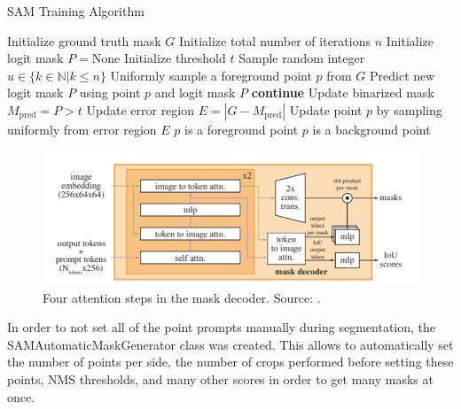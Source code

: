 \begin{algorithm}
	\caption{SAM Training Algorithm}
	\begin{algorithmic}[1]
		\State Initialize ground truth mask $G$
		\State Initialize total number of iterations $n$
		\State Initialize logit mask $ P = \text{None}$
		\State Initialize threshold $t$
		\State Sample random integer $u\in \{k \in \mathbb{N}|k\leq n\}$
		\State Uniformly sample a foreground point $p$ from $G$
			\State Predict new logit mask $P$ using point $p$ and logit mask $P$
				\State \textbf{continue}
			\EndIf
			\State Update binarized mask $M_{\text{pred}} = P > t$ 
			\State Update error region $E = |G - M_{\text{pred}}|$
			\State Update point $p$ by sampling uniformly from error region $E$
				\State $p$ is a foreground point
				\State $p$ is a background point
			\EndIf
		\EndFor
	\end{algorithmic}
\end{algorithm}

\begin{figure}
	\centering
	\includegraphics[width=\textwidth]{"images/maskdecoder.png"}
	\caption[\texttt{SAM} mask decoder]{Four attention steps in the mask decoder. Source: \cite{kirillov2023segment}.}
	\label{figdecoder}
\end{figure}

In order to not set all of the point prompts manually during segmentation, the SAMAutomaticMaskGenerator class was created. This allows to automatically set the number of points per side, the number of crops performed before setting these points, NMS thresholds, and many other scores in order to get many masks at once.